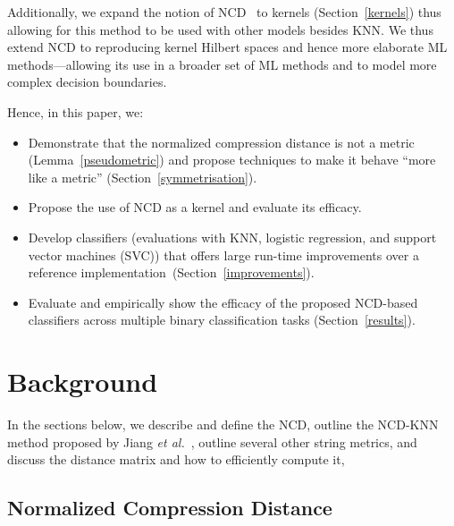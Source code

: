 \documentclass[preprint,12pt]{article}
\begin{document}
Additionally, we expand the notion of NCD~\cite{opitz2023gzip,weinreich2023parameter,nishida2011tweet,ncd,jiang2022less,jiang2022less} to kernels (Section~\ref{kernels}) thus allowing for this method to be used with other models besides KNN.
We thus extend NCD to reproducing kernel Hilbert spaces and hence more elaborate ML methods---allowing its use in a broader set of ML methods and to model more complex decision boundaries.

Hence, in this paper, we:

\begin{itemize}
    \item Demonstrate that the normalized compression distance is not a metric (Lemma~\ref{pseudometric}) and propose techniques to make it behave ``more like a metric'' (Section~\ref{symmetrisation}).
    \item Propose the use of NCD as a kernel and evaluate its efficacy.
    \item Develop classifiers (evaluations with KNN, logistic regression, and support vector machines (SVC)) that offers large run-time improvements over a reference implementation~\cite{jiang2022less}(Section~\ref{improvements}).
    \item Evaluate and empirically show the efficacy of the proposed NCD-based classifiers across multiple binary classification tasks (Section~\ref{results}).
\end{itemize}



\section{Background}

In the sections below, we describe and define the NCD, outline the NCD-KNN method proposed by Jiang \textit{et al.}~\cite{jiang2022less}, outline several other string metrics, and discuss the distance matrix and how to efficiently compute it,



\subsection{Normalized Compression Distance}
\label{ncd}
\end{document}
